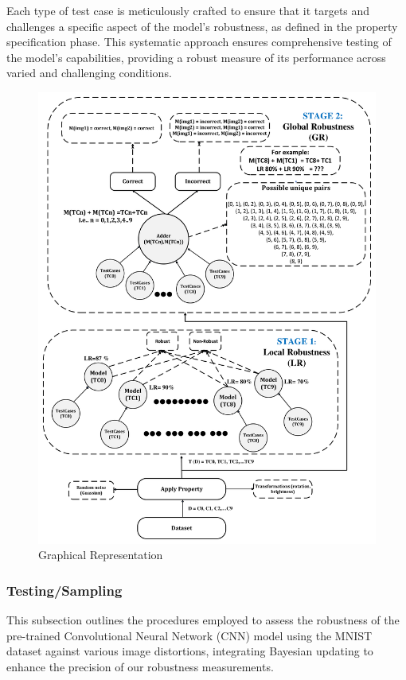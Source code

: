 \documentclass[10pt, conference, a4paper, final]{IEEEtran}
\begin{document}
Each type of test case is meticulously crafted to ensure that it targets and challenges a specific aspect of the model’s robustness, as defined in the property specification phase. This systematic approach ensures comprehensive testing of the model’s capabilities, providing a robust measure of its performance across varied and challenging conditions.
\begin{figure}{}
    \centering
    \includegraphics[width=\linewidth]{paper_images/MNIST Adder.pdf}
    \caption{Graphical Representation}
    \label{fig:graph}
\end{figure}
\subsubsection{Testing/Sampling}
This subsection outlines the procedures employed to assess the robustness of the pre-trained Convolutional Neural Network (CNN) model using the MNIST dataset against various image distortions, integrating Bayesian updating to enhance the precision of our robustness measurements.
\end{document}
